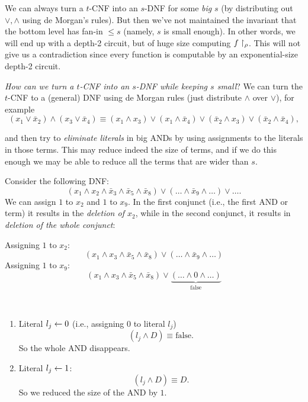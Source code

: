 \begin{note} We can always turn a $t$-CNF into an $s$-DNF for some \textit{big} $s$ (by distributing out \(\lor, \land\) using de Morgan's rules).
But then we've not maintained the invariant that the bottom level has fan-in \(\leq s\) (namely, \(s\) is small enough).
In other words, we will end up with a depth-2 circuit, but of huge size computing \(f\upharpoonright_\rho\). This will not give us a contradiction since every function is computable by an exponential-size depth-2 circuit.
\end{note}

\emph{How can we  turn a $t$-CNF into an $s$-DNF while keeping $s$ small}?
We can turn the $t$-CNF to a (general) DNF using de Morgan rules (just distribute $\wedge$ over $\vee$), for example
\[
(x_1 \vee \bar{x}_2) \wedge (x_3 \vee \bar{x}_4) \equiv (x_1 \wedge x_3) \vee (x_1 \wedge \bar{x}_4) \vee (\bar{x}_2 \wedge x_3) \vee (\bar{x}_2 \wedge \bar{x}_4),
\]

and then try to \emph{eliminate literals} in big ANDs by using assignments to the literals in those terms. This may reduce indeed the size of terms, and if we do this enough we may be able to reduce all the terms that are wider than $s$.
 
 
Consider the following DNF:
\[
(x_1 \wedge x_2 \wedge \bar{x}_3 \wedge \bar{x}_5 \wedge \bar{x}_8) \vee ( \dots \wedge \bar{x}_9 \wedge \dots)\lor\dots.
\] We can assign $1$ to $x_2$ and $1$ to $x_9$. In the first conjunct (i.e., the first AND or term) it results in the \emph{deletion of $x_2$}, while in the second conjunct, it results in \emph{deletion of the whole conjunct}:

Assigning $1$ to $x_2$:
\[
(x_1 \wedge x_3 \wedge \bar{x}_5 \wedge \bar{x}_8) \vee ( \dots \wedge \bar{x}_9 \wedge \dots )
\]
Assigning $1$ to $x_9$:
\[
(x_1 \wedge x_3 \wedge \bar{x}_5 \wedge \bar{x}_8) \vee \underbrace{( \dots\wedge 0 \wedge \dots)}_{\text{false}} 
\]





\begin{note}\
\begin{enumerate}
    \item Literal $l_j \leftarrow 0$ (i.e., assigning $0$ to literal $l_j$)
    \[
        (l_j \wedge D) \equiv \text{false}.
    \]
    So the whole AND disappears.
    
    \item Literal $l_j \leftarrow 1$:
    \[
        (l_j \wedge D) \equiv D.
    \]
    So we reduced the size of the AND by $1$.
\end{enumerate}
\end{note}

